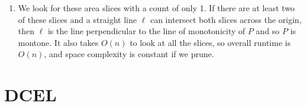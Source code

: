 \documentclass [12pt]{article}
\begin{document}
\begin{enumerate}[label=\alph*.]
\begin{enumerate}[label=\arabic*)]
                    \item We look for these area slices with a count of only 1. If there are at least two of these slices and a straight line $\ell$ can intersect both slices across the origin, then $\ell$ is the line perpendicular to the line of monotonicity of $P$ and so $P$ is montone. It also takes $O(n)$ to look at all the slices, so overall runtime is $O(n)$, and space complexity is constant if we prune. 
                \end{enumerate}

        \end{enumerate}

    \pagebreak



    \section{DCEL}
    \label{sec:four}
\end{document}
